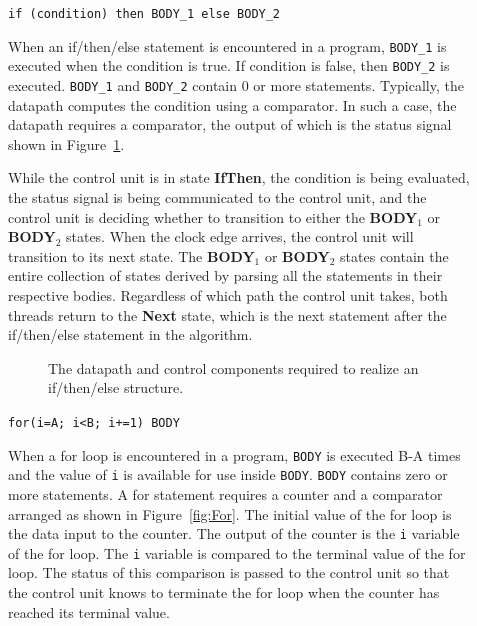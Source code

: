 \begin{description}
\item[]\verb^if (condition) then BODY_1 else BODY_2^

When an if/then/else statement is encountered in a program, 
\verb^BODY_1^ is executed when the condition is true.  If condition 
is false, then \verb^BODY_2^ is executed.  \verb^BODY_1^ and \verb^BODY_2^ 
contain 0 or more statements.  Typically, the datapath computes 
the condition using a comparator.  In such a case, the datapath 
requires a comparator, the output of which is
the status signal shown in Figure~\ref{fig:IfThen}.  

While the control unit is in state {\bf IfThen}, the condition 
is being evaluated, the status signal
is being communicated to the control unit, and the control
unit is deciding whether to transition to either the 
{\bf BODY}$_1$ or {\bf BODY}$_2$ states.  When the clock 
edge arrives, the control unit will transition to its next state.
The {\bf BODY}$_1$ or {\bf BODY}$_2$ states contain the entire 
collection of states derived by parsing all the statements in 
their respective bodies.  Regardless of which path the control 
unit takes, both threads return to the {\bf Next} state, which 
is the next statement after the if/then/else statement in the algorithm.

\begin{figure}[ht]
\caption{The datapath and control components required to realize
an if/then/else structure.}
\label{fig:IfThen}
\end{figure}

\item[]\verb^for(i=A; i<B; i+=1) BODY^

When a for loop is encountered in a program, \verb^BODY^ is 
executed B-A times and the value of \verb^i^ is available 
for use inside \verb^BODY^.  \verb^BODY^ contains 
zero or more statements.  A for statement requires a counter and a 
comparator arranged as shown in Figure~\ref{fig:For}.  The initial
value of the for loop is the data input to the counter.  The 
output of the counter is the \verb+i+ variable of the for loop.  The
\verb+i+ variable is compared to the terminal value of the for loop.
The status of this comparison is passed to the control 
unit so that the control unit knows to terminate the for loop
when the counter has reached its terminal value.


\end{description}
